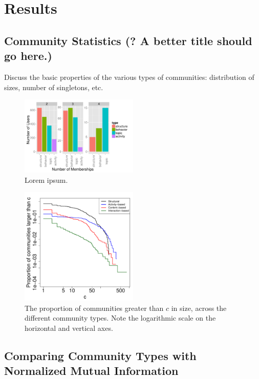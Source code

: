 \section{Results}

\subsection{Community Statistics (? A better title should go here.)}

Discuss the basic properties of the various types of communities: distribution of sizes, number of singletons, etc.

\begin{figure}[h!]
  \centering
\includegraphics[width=0.50\textwidth]{Figures/overlap_by_type.pdf}
\caption{Lorem ipsum.}
\label{Fig-}
\end{figure}

\begin{figure}[h!]
  \centering
\includegraphics[width=0.50\textwidth]{Figures/comm_sizes_ecdf_loglog.pdf}
\caption{The proportion of communities greater than $c$ in size, across the different community types. Note the logarithmic scale on the horizontal and vertical axes.}
\label{Fig-community_size_distribution}
\end{figure}

\subsection{Comparing Community Types with Normalized Mutual Information}

